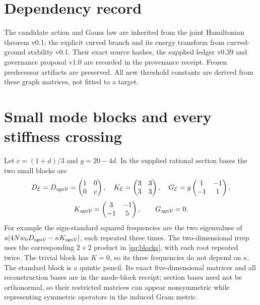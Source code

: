 \documentclass[11pt,a4paper]{article}
\begin{document}
\section{Dependency record}
The candidate action and Gauss law are inherited from the joint Hamiltonian theorem v0.1; the explicit curved branch and its energy transform from curved-ground stability v0.1. Their exact source hashes, the supplied ledger v0.39 and governance proposal v1.0 are recorded in the provenance receipt. Frozen predecessor artifacts are preserved. All new threshold constants are derived from these graph matrices, not fitted to a target.

\newpage
\appendix
\section{Small mode blocks and every stiffness crossing}
Let $c=(1+d)/3$ and $g=20-4d$. In the supplied rational section bases the two small blocks are
\[
D_{\mathcal E}=D_{\rm sgn\mathcal V}=\begin{pmatrix}1&0\\0&c\end{pmatrix},
\quad K_{\mathcal E}=\begin{pmatrix}3&3\\3&3\end{pmatrix},
\quad G_{\mathcal E}=g\begin{pmatrix}1&-1\\-1&1\end{pmatrix},
\]
\[
K_{\rm sgn\mathcal V}=\begin{pmatrix}3&-1\\-1&5\end{pmatrix},
\qquad G_{\rm sgn\mathcal V}=0.
\]
For example the sign-standard squared frequencies are the two eigenvalues of
$a[4Nw_0D_{\rm sgn\mathcal V}-\kappa K_{\rm sgn\mathcal V}]$, each repeated three times. The two-dimensional irrep uses the corresponding $2\times2$ product in \eqref{eq:blocks}, with each root repeated twice. The trivial block has $K=0$, so its three frequencies do not depend on $\kappa$. The standard block is a quintic pencil. Its exact five-dimensional matrices and all reconstruction bases are in the mode-block receipt; section bases need not be orthonormal, so their restricted matrices can appear nonsymmetric while representing symmetric operators in the induced Gram metric.
\end{document}

